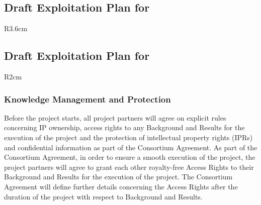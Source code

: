 \documentclass[a4paper,11pt]{article}
\begin{document}
\horizontalline

\subsection*{Draft Exploitation Plan for \SCCHshort{}}
\vspace{-6pt}

\begin{wrapfigure}{R}{3.6cm}
\vspace{-1.3cm}
\hfill {}
\vspace{-0.8cm}
\end{wrapfigure}

\horizontalline

\subsection*{Draft Exploitation Plan for \SAshort{}}

\begin{wrapfigure}{R}{2cm}
\vspace{-1.4cm}
\hfill {}
\vspace{-0.9cm}
\end{wrapfigure}

\subsubsection{Knowledge Management and Protection}
\vspace{-12pt}


Before the project starts, all project partners will agree on explicit rules concerning IP ownership, access rights to any
Background and Results for the execution of the project and the
protection of intellectual property rights (IPRs) and confidential
information as part of the Consortium Agreement.
As part of the Consortium Agreement, in order to ensure a smooth
execution of the project, the project partners will agree to grant each other
royalty-free Access Rights to their Background and Results for the
execution of the project. The Consortium Agreement will define further
details concerning the Access Rights after the duration of the project 
with respect to Background and Results.
\end{document}
